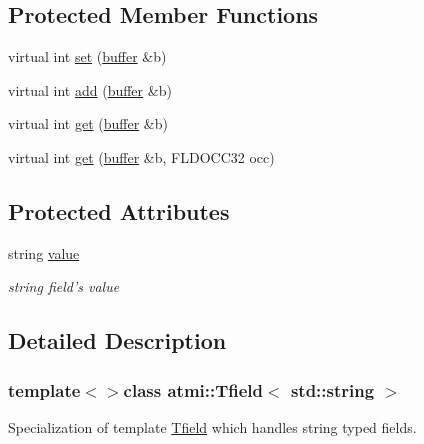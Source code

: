 \subsection*{Protected Member Functions}
\begin{DoxyCompactItemize}
\item 
virtual int \hyperlink{classatmi_1_1_tfield_3_01std_1_1string_01_4_a356a0e794a33bcfc1d3f4d8376e764d9}{set} (\hyperlink{classatmi_1_1buffer}{buffer} \&b)
\item 
virtual int \hyperlink{classatmi_1_1_tfield_3_01std_1_1string_01_4_af17fc3c22ce857f9d96f96d6c175b6d5}{add} (\hyperlink{classatmi_1_1buffer}{buffer} \&b)
\item 
virtual int \hyperlink{classatmi_1_1_tfield_3_01std_1_1string_01_4_afecf8218a3c312df34c36f334c995ac7}{get} (\hyperlink{classatmi_1_1buffer}{buffer} \&b)
\item 
virtual int \hyperlink{classatmi_1_1_tfield_3_01std_1_1string_01_4_a34f9956af4b0b98730595258e6c251e2}{get} (\hyperlink{classatmi_1_1buffer}{buffer} \&b, F\+L\+D\+O\+C\+C32 occ)
\end{DoxyCompactItemize}
\subsection*{Protected Attributes}
\begin{DoxyCompactItemize}
\item 
\hypertarget{classatmi_1_1_tfield_3_01std_1_1string_01_4_a8c0e9d6d6ef699d221ef18fb0a048230}{string \hyperlink{classatmi_1_1_tfield_3_01std_1_1string_01_4_a8c0e9d6d6ef699d221ef18fb0a048230}{value}}\label{classatmi_1_1_tfield_3_01std_1_1string_01_4_a8c0e9d6d6ef699d221ef18fb0a048230}

\begin{DoxyCompactList}\small\item\em string field's value \end{DoxyCompactList}\end{DoxyCompactItemize}


\subsection{Detailed Description}
\subsubsection*{template$<$$>$class atmi\+::\+Tfield$<$ std\+::string $>$}

Specialization of template \hyperlink{classatmi_1_1_tfield}{Tfield} which handles string typed fields.

